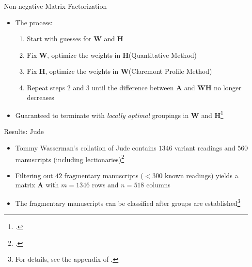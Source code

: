 \documentclass[10pt]{beamer}
\begin{document}
	\begin{frame}{Non-negative Matrix Factorization}
		\begin{itemize}
			\item The process:
			\begin{enumerate}
				\item Start with guesses for $\mathbf{W}$ and $\mathbf{H}$
				\item Fix $\mathbf{W}$, optimize the weights in $\mathbf{H}$\hfill(Quantitative Method)
				\item Fix $\mathbf{H}$, optimize the weights in $\mathbf{W}$\hfill(Claremont Profile Method)
				\item Repeat steps 2 and 3 until the difference between $\mathbf{A}$ and $\mathbf{W}\mathbf{H}$ no longer decreases
			\end{enumerate}
			\begin{center}
			\end{center}
			\item Guaranteed to terminate with \emph{locally optimal} groupings in $\mathbf{W}$ and $\mathbf{H}$\footnote{\cite{GS00}.}
		\end{itemize}
	\end{frame}
	\begin{frame}{Results: Jude}
		\begin{itemize}
			\item Tommy Wasserman's collation of Jude contains $1346$ variant readings and $560$ manuscripts (including lectionaries)\footnote{\cite{Wasserman06}.}
			\item Filtering out $42$ fragmentary manuscripts ($< 300$ known readings) yields a matrix $\mathbf{A}$ with $m = 1346$ rows and $n = 518$ columns
			\item The fragmentary manuscripts can be classified after groups are established\footnote{For details, see the appendix of \cite{McCollum19}.}
		\end{itemize}
	\end{frame}
\end{document}
